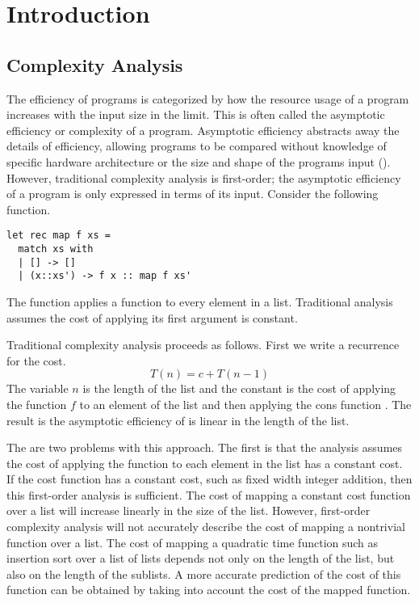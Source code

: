 \chapter{Introduction}

\section{Complexity Analysis}

The efficiency of programs is categorized by how the resource usage of a
program increases with the input size in the limit.  This is often called the
asymptotic efficiency or complexity of a program.  Asymptotic efficiency
abstracts away the details of efficiency, allowing programs to be compared
without knowledge of specific hardware architecture or the size and shape of
the programs input (\citet{Cormen2001}).  However, traditional complexity
analysis is first-order; the asymptotic efficiency of a program is only
expressed in terms of its input.  Consider the following function.
%
\lstset{language=[Objective]Caml}
\begin{lstlisting}
let rec map f xs =
  match xs with
  | [] -> []
  | (x::xs') -> f x :: map f xs'
\end{lstlisting}
%
The function  applies a function to every element in a list.
Traditional analysis assumes the cost of applying its first argument is
constant.




Traditional complexity analysis proceeds as follows.  First we write a
recurrence for the cost.  \[ T(n) = c + T(n-1) \] The variable $n$ is the
length of the list and the constant  is the cost of applying the function
$f$ to an element of the list and then applying the cons function \T{::}. The
result is the asymptotic efficiency of  is linear in the length of the
list.



The are two problems with this approach.  The first is that the analysis
assumes the cost of applying the function  to each element in the list has
a constant cost. If the cost function has a constant cost, such as fixed
width integer addition, then this first-order analysis is sufficient.  The cost
of mapping a constant cost function over a list will increase linearly in the
size of the list.  However, first-order complexity analysis will not accurately
describe the cost of mapping a nontrivial function over a list. The cost of
mapping a quadratic time function such as insertion sort over a list of lists
depends not only on the length of the list, but also on the length of the
sublists.  A more accurate prediction of the cost of this function can be
obtained by taking into account the cost of the mapped function.



